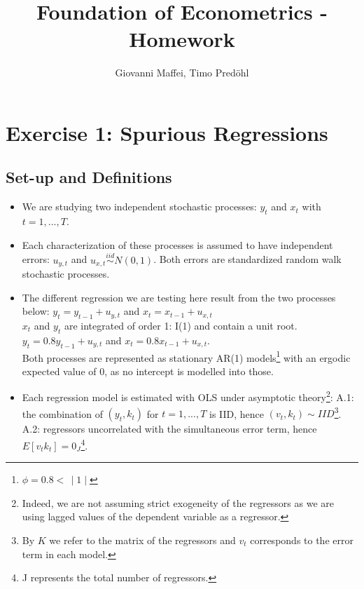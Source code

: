 \documentclass[12pt]{article}
\title{Foundation of Econometrics - Homework}
\author{Giovanni Maffei, Timo Predöhl}
\newcommand{\replacedTP}[2]{\replaced[id=tp]{#2}{#1}}
\begin{document}
	
	\maketitle
	
	\begin{spacing}{1}
		\tableofcontents		
	\end{spacing}
	
	\pagebreak

	\section{Exercise 1: Spurious Regressions}
	\subsection{Set-up and Definitions}
	\begin{itemize}
		\item We are studying two independent stochastic processes: $y_t$ and $x_t$  with $t=1,...,T$.
		\item Each characterization of these processes is assumed to have independent errors: $u_{y,t}$ and $u_{x,t} \overset{iid}{\sim}N(0,1)$.
			\subitem Both errors are standardized random walk stochastic processes.
		\item The different regression \replacedTP{modeles}{models} we are testing here result from the two processes below:
			\subitem $y_t = y_{t-1} + u_{y,t}$ and $x_t = x_{t-1} + u_{x,t}$ \vspace{0.5em}\\ 
			$x_t$ and $y_t$ are integrated of order 1: I(1) and contain a unit root.
			\subitem $y_t = 0.8y_{t-1} + u_{y,t}$ and $x_t = 0.8x_{t-1} + u_{x,t}$.\vspace{0.5em}\\
			Both processes are represented as stationary AR(1) models\footnote{$\phi = 0.8 < \,\mid1\mid$} with an ergodic expected value of 0, as no intercept is modelled into those.
		\item Each regression model is estimated with OLS under asymptotic theory\footnote{Indeed, we are not assuming strict exogeneity of the regressors as we are using lagged values of the dependent variable as a regressor.}:
			\subitem A.1: the combination of $(y_t, k_t)$ for $t = 1,...,T$ is IID, hence $(v_t, k_t)\sim IID$\footnote{By $K$ we refer to the matrix of the regressors and $v_t$ corresponds to the error term in each model.}.
			\subitem A.2: regressors uncorrelated with the simultaneous error term, hence $E[v_{t}k_{t}]=0_J$\footnote{J represents the total number of regressors.}.

\end{itemize}
\end{document}
